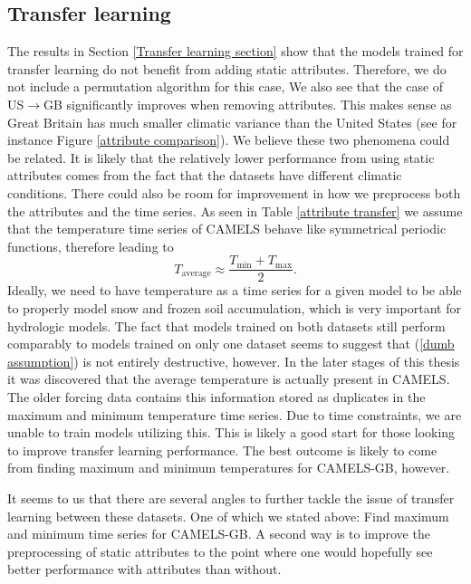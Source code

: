 \subsection{Transfer learning}
The results in Section \ref{Transfer learning section} show that the models trained 
for transfer learning do not benefit from adding static attributes. Therefore, we 
do not include a permutation algorithm for this case, We also see 
that the case of US$\rightarrow$GB significantly improves when removing attributes. This makes 
sense as Great Britain has much smaller climatic variance than the United States 
(see for instance Figure \ref{attribute comparison}). We believe these two phenomena could be related. It is likely 
that the relatively lower performance from using static attributes comes from the 
fact that the datasets have different climatic conditions. There could also be 
room for improvement in how we preprocess both the attributes and the time series. 
As seen in Table \ref{attribute transfer} we assume that the temperature time series 
of CAMELS behave like symmetrical periodic functions, therefore leading to 
\begin{equation}
T_\text{average} \approx  \frac{T_\text{min}+T_\text{max}}{2}. \label{dumb assumption}
\end{equation}
Ideally, we need to have temperature as a time series for a given model to be able 
to properly model snow and frozen soil accumulation, which is very important for 
hydrologic models. The fact that models trained on both datasets 
still perform comparably to models trained on only one dataset seems to suggest 
that (\ref{dumb assumption}) is not entirely destructive, however.
In the later stages of this thesis it was discovered that the average temperature 
is actually present in CAMELS. The older forcing data \citep{maurer} contains 
this information stored as duplicates in the maximum and minimum temperature time 
series. Due to time constraints, we are unable to train models utilizing this. 
This is likely a good start for those looking to improve transfer learning 
performance. 
The best outcome is likely to come from finding maximum and minimum temperatures 
for CAMELS-GB, however.

It seems to us that there are several angles to further tackle the issue of transfer 
learning between these datasets. One of which we stated above: Find maximum and minimum time series for 
CAMELS-GB. A second way is to improve the preprocessing of static attributes to 
the point where one would hopefully see better performance with attributes than 
without.  

